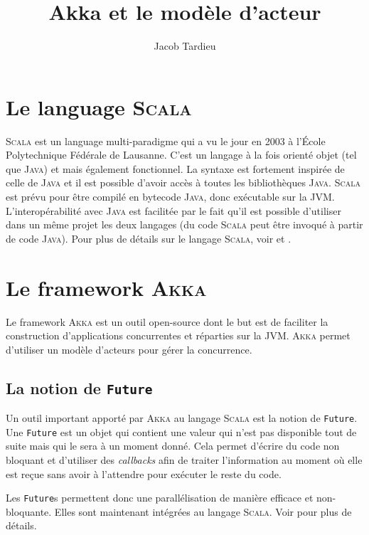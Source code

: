 \documentclass[11pt,a4paper]{article}
\title{Akka et le modèle d'acteur}
\author{Jacob Tardieu}
\begin{document}
\maketitle

\section{Le language \textsc{Scala}}
\textsc{Scala} \cite{scala:website} est un language multi-paradigme qui a vu le jour en 2003 à l'École Polytechnique Fédérale de Lausanne. C'est un langage à la fois orienté objet (tel que \textsc{Java}) et mais également fonctionnel. La syntaxe est fortement inspirée de celle de \textsc{Java} et il est possible d'avoir accès à toutes les bibliothèques \textsc{Java}. \textsc{Scala} est prévu pour être compilé en bytecode \textsc{Java}, donc exécutable sur la JVM. L'interopérabilité avec \textsc{Java} est facilitée par le fait qu'il est possible d'utiliser dans un même projet les deux langages (du code \textsc{Scala} peut être invoqué à partir de code \textsc{Java}).
Pour plus de détails sur le langage \textsc{Scala}, voir \cite{wiki:scala} et \cite{scala:website}.

\section{Le framework \textsc{Akka}}
Le framework \textsc{Akka} \cite{akka:website} est un outil open-source dont le but est de faciliter la construction d'applications concurrentes et réparties sur la JVM. \textsc{Akka} permet d'utiliser un modèle d'acteurs pour gérer la concurrence.

\subsection{La notion de \texttt{Future}}
Un outil important apporté par \textsc{Akka} au langage \textsc{Scala} est la notion de \texttt{Future}. Une \texttt{Future} est un objet qui contient une valeur qui n'est pas disponible tout de suite mais qui le sera à un moment donné.
Cela permet d'écrire du code non bloquant et d'utiliser des \textit{callbacks} afin de traiter l'information au moment où elle est reçue sans avoir à l'attendre pour exécuter le reste du code.

Les \texttt{Future}s permettent donc une parallélisation de manière efficace et non-bloquante. Elles sont maintenant intégrées au langage \textsc{Scala}. Voir \cite{scala:futures} pour plus de détails.
\end{document}
